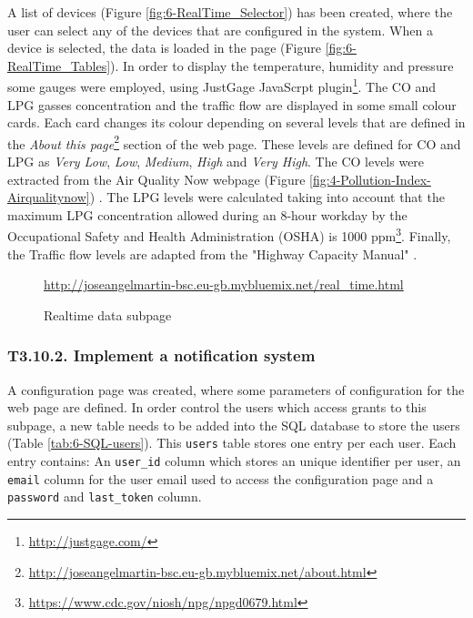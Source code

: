 A list of devices (Figure \ref{fig:6-RealTime_Selector}) has been created, where the user can select any of the devices that are configured in the system. When a device is selected, the data is loaded in the page (Figure \ref{fig:6-RealTime_Tables}). In order to display the temperature, humidity and pressure some gauges were employed, using JustGage JavaScrpt plugin\footnote{\url{http://justgage.com/}}. The CO and LPG gasses concentration and the traffic flow are displayed in some small colour cards. Each card changes its colour depending on several levels that are defined in the \textit{About this page}\footnote{\url{http://joseangelmartin-bsc.eu-gb.mybluemix.net/about.html}} section of the web page. These levels are defined for CO and LPG as \textit{Very Low}, \textit{Low}, \textit{Medium}, \textit{High} and \textit{Very High}. The CO levels were extracted from the Air Quality Now webpage (Figure \ref{fig:4-Pollution-Index-Airqualitynow}) \cite{airqualitynow}. The LPG levels were calculated taking into account that the maximum LPG concentration allowed during an 8-hour workday by the Occupational Safety and Health Administration (OSHA) is 1000 ppm\footnote{\url{https://www.cdc.gov/niosh/npg/npgd0679.html}}. Finally, the Traffic flow levels are adapted from the "Highway Capacity Manual" \cite{HCM2000}.

\begin{figure}[htb]
	\centering
	\caption{Realtime data subpage}
	\label{fig:6-RealTime}{\url{http://joseangelmartin-bsc.eu-gb.mybluemix.net/real_time.html}}
\end{figure}


\subsubsection{T3.10.2. Implement a notification system}
A configuration page was created, where some parameters of configuration for the web page are defined. In order control the users which access grants to this subpage, a new table needs to be added into the SQL database to store the users (Table \ref{tab:6-SQL-users}). This \texttt{users} table stores one entry per each user. Each entry contains: An \texttt{user\_id} column which stores an unique identifier per user, an \texttt{email} column for the user email used to access the configuration page and a \texttt{password} and \texttt{last\_token} column.


